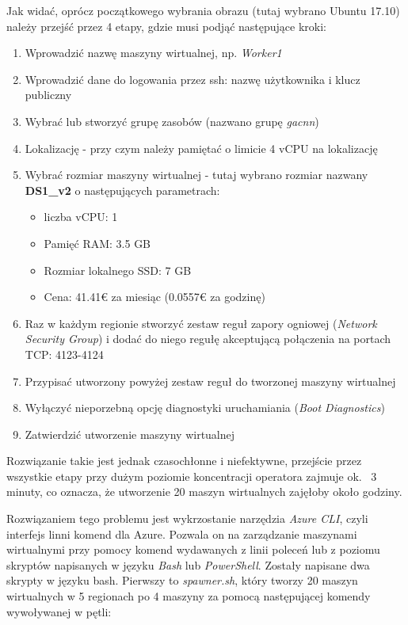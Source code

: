 Jak widać, oprócz początkowego wybrania obrazu (tutaj wybrano Ubuntu 17.10) należy przejść przez 4 etapy, gdzie musi podjąć następujące kroki:
\begin{enumerate}
  \item Wprowadzić nazwę maszyny wirtualnej, np. \textit{Worker1}
  \item Wprowadzić dane do logowania przez ssh: nazwę użytkownika i klucz publiczny
  \item Wybrać lub stworzyć grupę zasobów (nazwano grupę \textit{gacnn})
  \item Lokalizację - przy czym należy pamiętać o limicie 4 vCPU na lokalizację
  \item Wybrać rozmiar maszyny wirtualnej - tutaj wybrano rozmiar nazwany \textbf{DS1\_v2} o następujących parametrach:
  \begin{itemize}
    \item liczba vCPU: 1
    \item Pamięć RAM: 3.5 GB
    \item Rozmiar lokalnego SSD: 7 GB
    \item Cena: 41.41€ za miesiąc (0.0557€ za godzinę)
  \end{itemize}
  \item Raz w każdym regionie stworzyć zestaw reguł zapory ogniowej (\textit{Network Security Group}) i dodać do niego regułę akceptującą połączenia na portach TCP: 4123-4124
  \item Przypisać utworzony powyżej zestaw reguł do tworzonej maszyny wirtualnej
  \item Wyłączyć nieporzebną opcję diagnostyki uruchamiania (\textit{Boot Diagnostics})
  \item Zatwierdzić utworzenie maszyny wirtualnej
\end{enumerate}
Rozwiązanie takie jest jednak czasochłonne i niefektywne, przejście przez wszystkie etapy przy dużym poziomie koncentracji operatora zajmuje ok. ~3 minuty, co oznacza, że utworzenie 20 maszyn wirtualnych zajęłoby około godziny.

Rozwiązaniem tego problemu jest wykrzostanie narzędzia \textit{Azure CLI}, czyli interfejs linni komend dla Azure.
Pozwala on na zarządzanie maszynami wirtualnymi przy pomocy komend wydawanych z linii poleceń lub z poziomu skryptów napisanych w języku \textit{Bash} lub \textit{PowerShell}.
Zostały napisane dwa skrypty w języku bash.
Pierwszy to \textit{spawner.sh}, który tworzy 20 maszyn wirtualnych w 5 regionach po 4 maszyny za pomocą następującej komendy wywoływanej w pętli:\\

